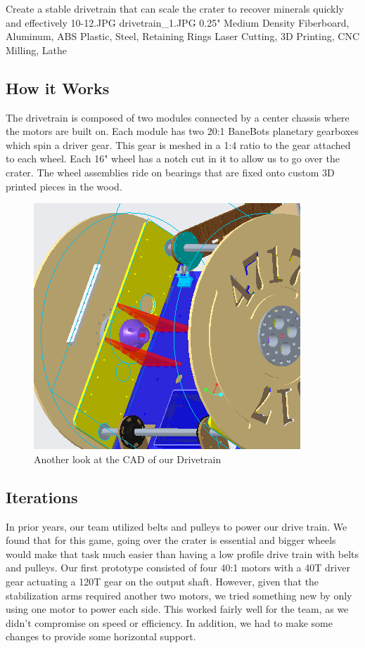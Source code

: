 {Create a stable drivetrain that can scale the crater to recover minerals quickly and effectively} %
{10-12.JPG}%
{drivetrain_1.JPG}%
{0.25" Medium Density Fiberboard, Aluminum, ABS Plastic, Steel, Retaining Rings}%
{Laser Cutting, 3D Printing, CNC Milling, Lathe}%

\subsection*{How it Works}
The drivetrain is composed of two modules connected by a center chassis where the motors are built on. Each module has two 20:1 BaneBots planetary gearboxes which spin a driver gear. This gear is meshed in a 1:4 ratio to the gear attached to each wheel. Each 16" wheel has a notch cut in it to allow us to go over the crater. The wheel assemblies ride on bearings that are fixed onto custom 3D printed pieces in the wood.

\begin{figure}[htp]
\centering
\includegraphics[width=.8\linewidth]{Design_Overview/DT_cad.PNG}
\caption{Another look at the CAD of our Drivetrain}
\label{fig:iteration}
\end{figure}

\subsection*{Iterations}
In prior years, our team utilized belts and pulleys to power our drive train. We found that for this game, going over the crater is essential and bigger wheels would make that task much easier than having a low profile drive train with belts and pulleys. Our first prototype consisted of four 40:1 motors with a 40T driver gear actuating a 120T gear on the output shaft. However, given that the stabilization arms required another two motors, we tried something new by only using one motor to power each side. This worked fairly well for the team, as we didn't compromise on speed or efficiency. In addition, we had to make some changes to provide some horizontal support. 

